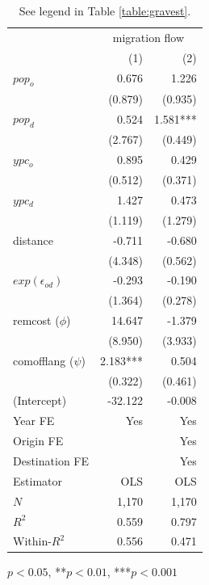 \documentclass[letterpaper,11pt]{article}
\begin{document}
\begin{table}[H]
	\centering
	\begin{threeparttable}
		\begin{tabular}{lrr}
		\toprule
		                & \multicolumn{2}{c}{migration flow} \\
		\cmidrule(lr){2-3}
		                &       (1) &                       (2) \\
		\midrule
		$pop_o$        &    0.676 &            1.226 \\
		                &  (0.879) &          (0.935)  \\
		$pop_d$        &    0.524 &         1.581*** \\
		                &  (2.767) &          (0.449) \\
		$ypc_o$        &    0.895 &            0.429 \\
		                &  (0.512) &          (0.371) \\
		$ypc_d$        &    1.427 &            0.473 \\
		                &  (1.119) &          (1.279) \\
		distance         &   -0.711 &           -0.680 \\
		                &  (4.348) &          (0.562) \\
		$exp(\epsilon_{od})$      &   -0.293 &           -0.190 \\
		                &  (1.364) &          (0.278) \\
		remcost  ($\phi$)        &   14.647 &           -1.379 \\
		                &  (8.950) &          (3.933) \\
		comofflang ($\psi$)    & 2.183*** &            0.504 \\
		                &  (0.322) &          (0.461) \\
		(Intercept) & -32.122 & -0.008  \\
		\midrule
		Year FE &       Yes &                       Yes \\
		Origin FE &           &                       Yes \\
		Destination FE &           &                       Yes \\
		\midrule
		Estimator       &       OLS &                       OLS \\
		\midrule
		$N$             &    1,170 &            1,170   \\
		$R^2$           &   0.559 &            0.797  \\
		Within-$R^2$   &    0.556 &            0.471 \\
		\bottomrule
		\end{tabular}
		\begin{tablenotes}
			\item *$p<0.05$, **$p<0.01$, ***$p<0.001$
		\end{tablenotes}
	\end{threeparttable}
	\caption{See legend in Table \ref{table:gravest}.}
	\label{table:gravestreg}
\end{table}
\end{document}
